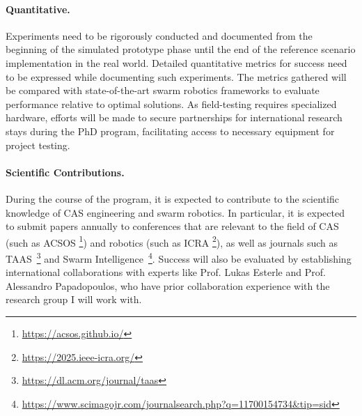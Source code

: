 \documentclass[12pt]{article}
\begin{document}
\paragraph{Quantitative.}
Experiments need to be rigorously conducted and documented from the beginning of the simulated prototype phase until the end of the reference scenario implementation in the real world.
Detailed quantitative metrics for success need to be expressed while documenting such experiments. 
The metrics gathered will be compared with state-of-the-art swarm robotics frameworks to evaluate performance relative to optimal solutions.
As field-testing requires specialized hardware, efforts will be made to secure partnerships for international research stays during the PhD program, facilitating access to necessary equipment for project testing.

\paragraph{Scientific Contributions.}
During the course of the program, it is expected to contribute to the scientific knowledge of CAS engineering and swarm robotics. 
In particular, it is expected to submit papers annually to conferences that are relevant to the field of CAS (such as ACSOS \footnote{\url{https://acsos.github.io/}}) and robotics (such as ICRA \footnote{\url{https://2025.ieee-icra.org/}}),
as well as journals such as TAAS~\footnote{\url{https://dl.acm.org/journal/taas}} and Swarm Intelligence~\footnote{\url{https://www.scimagojr.com/journalsearch.php?q=11700154734&tip=sid}}.
Success will also be evaluated by establishing international collaborations with experts like Prof. Lukas Esterle and Prof. Alessandro Papadopoulos, who have prior collaboration experience with the research group I will work with.
\clearpage

\renewcommand{\refname}{References}



\end{document}
